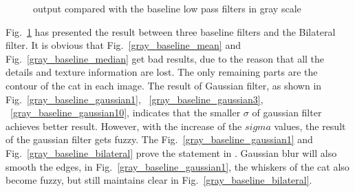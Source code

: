 \documentclass[12pt]{article}
\begin{document}
\begin{figure}[H]
  \quad
  \quad
  \caption{output compared with the baseline low pass filters in gray scale}
  \label{gray_baseline}
\end{figure}


Fig.~\ref{gray_baseline} has presented the result between three baseline filters and the Bilateral filter. 
It is obvious that Fig.~\ref{gray_baseline_mean} and Fig.~\ref{gray_baseline_median} get bad results, due to the reason that all the details and texture information are lost. 
The only remaining parts are the contour of the cat in each image.
The result of Gaussian filter, as shown in Fig.~\ref{gray_baseline_gaussian1}, ~\ref{gray_baseline_gaussian3}, ~\ref{gray_baseline_gaussian10}, indicates that the smaller $\sigma$ of gaussian filter achieves better result. 
However, with the increase of the $sigma$ values, the result of the gaussian filter gets fuzzy.
The Fig.~\ref{gray_baseline_gaussian1} and Fig.~\ref{gray_baseline_bilateral} prove the statement in \cite{paper_bf}.
Gaussian blur will also smooth the edges, in Fig.~\ref{gray_baseline_gaussian1}, the whiskers of the cat also become fuzzy, but still maintains clear in Fig.~\ref{gray_baseline_bilateral}.
\end{document}
